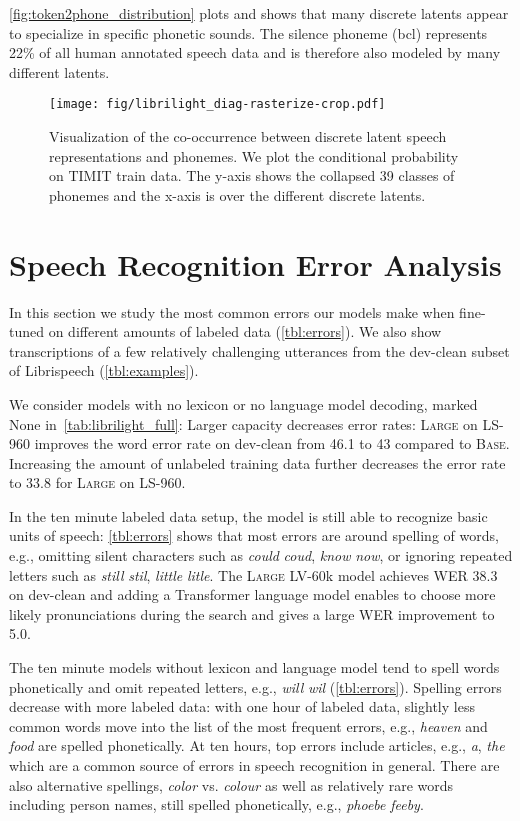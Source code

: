 \documentclass{article}
\newcommand{\wvppbase}{\textsc{Base}}
\newcommand{\wvppbig}{\textsc{Large}}
\newcommand{\voxsz}{LV-60k}
\newcommand{\librisz}{LS-960}
\begin{document}
\autoref{fig:token2phone_distribution} plots  and shows that many discrete latents appear to specialize in specific phonetic sounds.
The silence phoneme (bcl) represents 22\% of all human annotated speech data and is therefore also modeled by many different latents. 


\begin{figure}[h!]
\centering
\texttt{[image: fig/librilight\_diag-rasterize-crop.pdf]}
\caption{
Visualization of the co-occurrence between discrete latent speech representations and phonemes.
We plot the conditional probability  on TIMIT train data.
The y-axis shows the collapsed 39 classes of phonemes and the x-axis is over the different discrete latents.
}
\label{fig:token2phone_distribution}
\end{figure}





\newpage
\section{Speech Recognition Error Analysis}
\label{app:analysis_errors}

In this section we study the most common errors our models make when fine-tuned on different amounts of labeled data (\autoref{tbl:errors}). 
We also show transcriptions of a few relatively challenging utterances from the dev-clean subset of Librispeech (\autoref{tbl:examples}).

We consider models with no lexicon or no language model decoding, marked None in~\autoref{tab:librilight_full}:
Larger capacity decreases error rates: \wvppbig{} on \librisz{} improves the word error rate on dev-clean from 46.1 to 43 compared to \wvppbase{}.
Increasing the amount of unlabeled training data further decreases the error rate to 33.8 for \wvppbig{} on \librisz{}.


In the ten minute labeled data setup, the model is still able to recognize basic units of speech: \autoref{tbl:errors} shows that most errors are around spelling of words, e.g., omitting silent characters such as \emph{could}  \emph{coud}, \emph{know}  \emph{now}, or ignoring repeated letters such as \emph{still}  \emph{stil}, \emph{little}  \emph{litle}. 
The \wvppbig{} \voxsz{} model achieves WER 38.3 on dev-clean and adding a Transformer language model enables to choose more likely pronunciations during the search and gives a large WER improvement to 5.0.


The ten minute models without lexicon and language model tend to spell words phonetically and omit repeated letters, e.g., \emph{will}  \emph{wil} (\autoref{tbl:errors}).
Spelling errors decrease with more labeled data: 
with one hour of labeled data, slightly less common words move into the list of the most frequent errors, e.g., \emph{heaven} and \emph{food} are spelled phonetically. 
At ten hours, top errors include articles, e.g., \emph{a}, \emph{the} which are a common source of errors in speech recognition in general. 
There are also alternative spellings, \emph{color} vs. \emph{colour} as well as relatively rare words including person names, still spelled phonetically, e.g., \emph{phoebe}  \emph{feeby}. 
\end{document}
